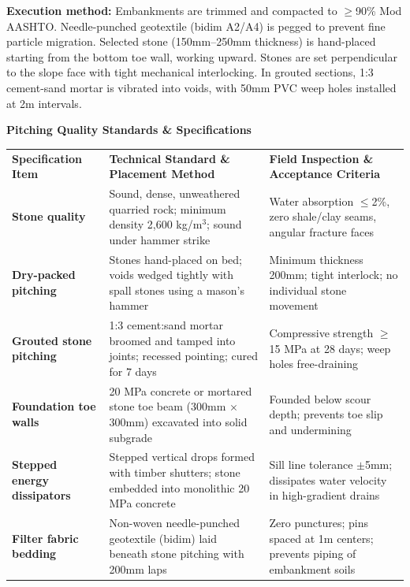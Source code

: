 \vspace{0.20cm}

\noindent
\begin{tcolorbox}[enhanced, colback=mhoffwhite, colframe=mhlightgray, boxrule=0.7pt, arc=4pt, left=9pt, right=9pt, top=7pt, bottom=7pt, borderline west={3pt}{0pt}{mhgold}, drop shadow=black!4]
    {\fontsize{8.1pt}{11.0pt}\selectfont\color{mhtext}
    \textbf{Execution method:} Embankments are trimmed and compacted to $\ge$90\% Mod AASHTO. Needle-punched geotextile (bidim A2/A4) is pegged to prevent fine particle migration. Selected stone (150mm--250mm thickness) is hand-placed starting from the bottom toe wall, working upward. Stones are set perpendicular to the slope face with tight mechanical interlocking. In grouted sections, 1:3 cement-sand mortar is vibrated into voids, with 50mm PVC weep holes installed at 2m intervals.
    }
\end{tcolorbox}

\vfill

\noindent
{\large\bfseries\color{mhnavy} Pitching Quality Standards \& Specifications}
\vspace{0.10cm}

{\fontsize{7.7pt}{9.8pt}\selectfont
\renewcommand{\arraystretch}{1.23}
\noindent
\begin{tabularx}{\textwidth}{@{}p{3.3cm} p{6.6cm} X@{}}
\rowcolor{mhnavy}
{\color{white}\bfseries Specification Item} & {\color{white}\bfseries Technical Standard \& Placement Method} & {\color{white}\bfseries Field Inspection \& Acceptance Criteria} \\
\rowcolor{mhbluelight}
\bfseries Stone quality & Sound, dense, unweathered quarried rock; minimum density 2,600 kg/m$^3$; sound under hammer strike & Water absorption $\le$2\%, zero shale/clay seams, angular fracture faces \\
\bfseries Dry-packed pitching & Stones hand-placed on bed; voids wedged tightly with spall stones using a mason's hammer & Minimum thickness 200mm; tight interlock; no individual stone movement \\
\rowcolor{mhbluelight}
\bfseries Grouted stone pitching & 1:3 cement:sand mortar broomed and tamped into joints; recessed pointing; cured for 7 days & Compressive strength $\ge$15 MPa at 28 days; weep holes free-draining \\
\bfseries Foundation toe walls & 20 MPa concrete or mortared stone toe beam (300mm $\times$ 300mm) excavated into solid subgrade & Founded below scour depth; prevents toe slip and undermining \\
\rowcolor{mhbluelight}
\bfseries Stepped energy dissipators & Stepped vertical drops formed with timber shutters; stone embedded into monolithic 20 MPa concrete & Sill line tolerance $\pm$5mm; dissipates water velocity in high-gradient drains \\
\bfseries Filter fabric bedding & Non-woven needle-punched geotextile (bidim) laid beneath stone pitching with 200mm laps & Zero punctures; pins spaced at 1m centers; prevents piping of embankment soils \\
\end{tabularx}
\renewcommand{\arraystretch}{1}
}

